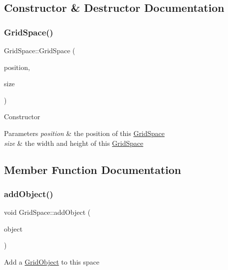 \subsection{Constructor \& Destructor Documentation}
\mbox{\label{classGridSpace_ae6fdb7de4f757789ae1dbca55445779c}} 
\subsubsection{\texorpdfstring{Grid\+Space()}{GridSpace()}}
{\footnotesize\ttfamily Grid\+Space\+::\+Grid\+Space (\begin{DoxyParamCaption}\item[{sf\+::\+Vector2f}]{position,  }\item[{sf\+::\+Vector2f}]{size }\end{DoxyParamCaption})}

Constructor


\begin{DoxyParams}{Parameters}
{\em position} & the position of this \hyperlink{classGridSpace}{Grid\+Space} \\
\hline
{\em size} & the width and height of this \hyperlink{classGridSpace}{Grid\+Space} \\
\hline
\end{DoxyParams}


\subsection{Member Function Documentation}
\mbox{\label{classGridSpace_a500df3fbf7fdf8869fd562412233a039}} 
\subsubsection{\texorpdfstring{add\+Object()}{addObject()}}
{\footnotesize\ttfamily void Grid\+Space\+::add\+Object (\begin{DoxyParamCaption}\item[{\hyperlink{classGridObject}{Grid\+Object} \&}]{object }\end{DoxyParamCaption})}

Add a \hyperlink{classGridObject}{Grid\+Object} to this space


